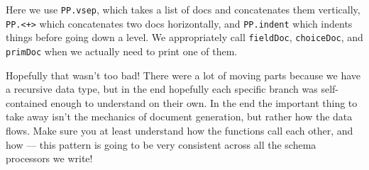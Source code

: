 \documentclass[]{article}
\newenvironment{Shaded}{}{}
\newcommand{\CommentTok}[1]{\textcolor[rgb]{0.38,0.63,0.69}{\textit{#1}}}
\newcommand{\DataTypeTok}[1]{\textcolor[rgb]{0.56,0.13,0.00}{#1}}
\newcommand{\DecValTok}[1]{\textcolor[rgb]{0.25,0.63,0.44}{#1}}
\newcommand{\FunctionTok}[1]{\textcolor[rgb]{0.02,0.16,0.49}{#1}}
\newcommand{\KeywordTok}[1]{\textcolor[rgb]{0.00,0.44,0.13}{\textbf{#1}}}
\newcommand{\NormalTok}[1]{#1}
\newcommand{\OperatorTok}[1]{\textcolor[rgb]{0.40,0.40,0.40}{#1}}
\newcommand{\OtherTok}[1]{\textcolor[rgb]{0.00,0.44,0.13}{#1}}
\newcommand{\StringTok}[1]{\textcolor[rgb]{0.25,0.44,0.63}{#1}}
\begin{document}
\begin{Shaded}
\end{Shaded}

Here we use \texttt{PP.vsep}, which takes a list of docs and concatenates them
vertically, \texttt{PP.\textless{}+\textgreater{}} which concatenates two docs
horizontally, and \texttt{PP.indent} which indents things before going down a
level. We appropriately call \texttt{fieldDoc}, \texttt{choiceDoc}, and
\texttt{primDoc} when we actually need to print one of them.

Hopefully that wasn't too bad! There were a lot of moving parts because we have
a recursive data type, but in the end hopefully each specific branch was
self-contained enough to understand on their own. In the end the important thing
to take away isn't the mechanics of document generation, but rather how the data
flows. Make sure you at least understand how the functions call each other, and
how --- this pattern is going to be very consistent across all the schema
processors we write!
\end{document}
